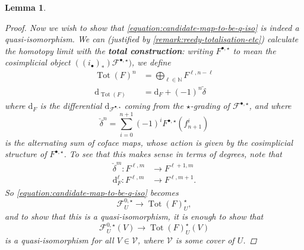 \documentclass[11pt,fleqn]{article}
\theoremstyle{plain}
\newtheorem{lemma}[theorem]{Lemma}
\theoremstyle{definition}
\theoremstyle{remark}
\numberwithin{equation}{theorem}
\newcommand{\anothercover}{\mathcal{V}}
\newcommand{\anotherbullet}{\star}
\newcommand{\define}[1]{\textbf{#1}}
\renewcommand{\d}{\mathrm{d}}
\DeclareMathOperator{\Tot}{Tot}
\begin{document}
\begin{lemma}
\begin{proof}
                Now we wish to show that \cref{equation:candidate-map-to-be-q-iso} is indeed a quasi-isomorphism.
                We can (justified by \cref{remark:reedy-totalisation-etc}) calculate the homotopy limit with the \define{total construction}: writing $F^{\bullet,\anotherbullet}$ to mean the cosimplicial object $((i_\bullet)_*)\mathcal{F}^{\bullet,\anotherbullet})$, we define
                \begin{align*}
                    \Tot(F)^n &= \bigoplus_{\ell\in\mathbb{N}} F^{\ell,n-\ell}
                \\  \d_{\Tot(F)} &= \d_F + (-1)^n\check\delta
                \end{align*}
                where $\d_F$ is the differential $\d_{\mathcal{F}^{\bullet,\anotherbullet}}$ coming from the $\anotherbullet$-grading of $\mathcal{F}^{\bullet,\anotherbullet}$, and where
                \[
                    \check\delta^n = \sum_{i=0}^{n+1} (-1)^i F^{\bullet,\anotherbullet}(f_{n+1}^i)
                \]
                is the alternating sum of coface maps, whose action is given by the cosimplicial structure of $F^{\bullet,\anotherbullet}$.
                To see that this makes sense in terms of degrees, note that
                \begin{align*}
                    \check{\delta}^m\colon
                    F^{\ell,m}
                    &\to
                    F^{\ell+1,m}
                \\  \d_F^\ell\colon
                    F^{\ell,m}
                    &\to
                    F^{\ell,m+1}.
                \end{align*}
                So \cref{equation:candidate-map-to-be-q-iso} becomes
                \begin{equation}
                    \mathcal{F}_U^{0,\anotherbullet}
                    \to
                    \Tot(F)_U^\anotherbullet,
                \end{equation}
                and to show that this is a quasi-isomorphism, it is enough to show that
                \begin{equation}
                \label{equation:candidate-map-to-be-q-iso-sections}
                    \mathcal{F}_U^{0,\anotherbullet}(V)
                    \to
                    \Tot(F)_U^\anotherbullet(V)
                \end{equation}
                is a quasi-isomorphism for all $V\in\anothercover$, where $\anothercover$ is some cover of $U$.


\end{proof}
\end{lemma}
\end{document}
